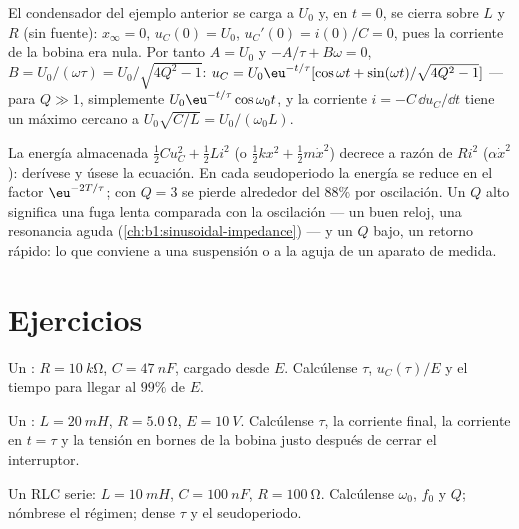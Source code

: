 \begin{example}\label{ex:b1:transient-regimes:ic}
El condensador del ejemplo anterior se carga a $U_0$ y, en $t = 0$, se
cierra sobre $L$ y $R$ (sin fuente): $x_\infty = 0$, $u_C(0) = U_0$,
$u_C'(0) = i(0)/C = 0$, pues la corriente de la bobina era nula. Por
tanto $A = U_0$ y $-A/\tau + B\omega = 0$, $B = U_0/(\omega\tau) =
U_0/\sqrt{4Q^2 - 1}$: $u_C = U_0\eu^{-t/\tau}[\cos\omega t + \sin(\omega
t)/\sqrt{4Q^2 - 1}]$ --- para $Q \gg 1$, simplemente $U_0\eu^{-t/\tau}\cos\omega_0 t$,
y la corriente $i = -C\,\dd u_C/\dd t$ tiene un máximo cercano a $U_0\sqrt{C/L} =
U_0/(\omega_0 L)$.
\end{example}

\begin{remark}[Energía]\label{rem:b1:transient-regimes:energy}
La energía almacenada $\tfrac12 Cu_C^2 + \tfrac12 Li^2$ (o $\tfrac12 kx^2
+ \tfrac12 m\dot x^2$) decrece a razón de $Ri^2$ ($\alpha\dot x^2$):
derívese y úsese la ecuación. En cada seudoperiodo la energía se reduce en
el factor $\eu^{-2T/\tau}$; con $Q = 3$ se pierde alrededor del $88\%$ por
oscilación. Un $Q$ alto significa una fuga lenta comparada con la
oscilación --- un buen reloj, una resonancia aguda
(\cref{ch:b1:sinusoidal-impedance}) --- y un $Q$ bajo, un retorno rápido:
lo que conviene a una suspensión o a la aguja de un aparato de medida.
\end{remark}

\section{Ejercicios}

\begin{exercise}[$\star$]\label{exo:b1:transient-regimes:1}
Un : $R = \qty{10}{k\ohm}$, $C = \qty{47}{nF}$, cargado desde
$E$. Calcúlense $\tau$, $u_C(\tau)/E$ y el tiempo para llegar al $99\%$ de $E$.
\end{exercise}

\begin{exercise}[$\star$]\label{exo:b1:transient-regimes:2}
Un : $L = \qty{20}{mH}$, $R = \qty{5.0}{\ohm}$, $E = \qty{10}{V}$.
Calcúlense $\tau$, la corriente final, la corriente en $t = \tau$ y la
tensión en bornes de la bobina justo después de cerrar el interruptor.
\end{exercise}

\begin{exercise}[$\star$]\label{exo:b1:transient-regimes:3}
Un RLC serie: $L = \qty{10}{mH}$, $C = \qty{100}{nF}$, $R = \qty{100}{\ohm}$.
Calcúlense $\omega_0$, $f_0$ y $Q$; nómbrese el régimen; dense $\tau$ y el
seudoperiodo.
\end{exercise}

